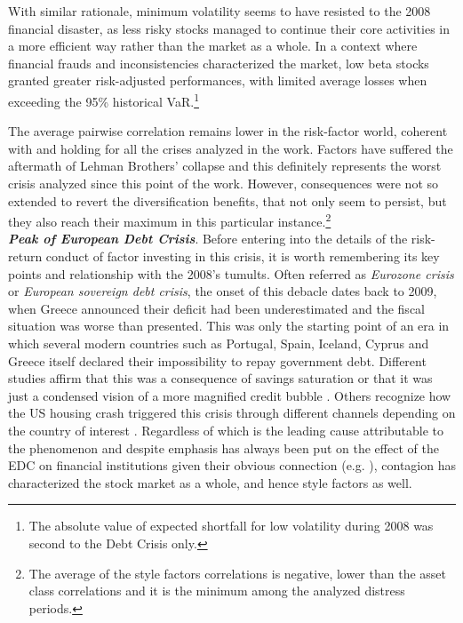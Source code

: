 \documentclass[12pt]{article}
\begin{document}
With similar rationale, minimum volatility seems to have resisted to the 2008 financial disaster, as less risky stocks managed to continue their core activities in a more efficient way rather than the market as a whole. In a context where financial frauds and inconsistencies characterized the market, low beta stocks granted greater risk-adjusted performances, with limited average losses when exceeding the 95\% historical VaR.\footnote{The absolute value of expected shortfall for low volatility during 2008 was second to the Debt Crisis only.}

The average pairwise correlation remains lower in the risk-factor world, coherent with  and holding for all the crises analyzed in the work. Factors have suffered the aftermath of Lehman Brothers' collapse and this definitely represents the worst crisis analyzed since this point of the work. However, consequences were not so extended to revert the diversification benefits, that not only seem to persist, but they also reach their maximum in this particular instance.\footnote{The average of the style factors correlations is negative, lower than the asset class correlations and it is the minimum among the analyzed distress periods.} \\


\textit{\textbf{Peak of European Debt Crisis}}. Before entering into the details of the risk-return conduct of factor investing in this crisis, it is worth remembering its key points and relationship with the 2008's tumults. Often referred as \textit{Eurozone crisis} or \textit{European sovereign debt crisis}, the onset of this debacle dates back to 2009, when Greece announced their deficit had been underestimated and the fiscal situation was worse than presented. This was only the starting point of an era in which several modern countries such as Portugal, Spain, Iceland, Cyprus and Greece itself declared their impossibility to repay government debt. Different studies affirm that this was a consequence of savings saturation or that it was just a condensed vision of a more magnified credit bubble \cite{lund2010debt}. Others recognize how the US housing crash triggered this crisis through different channels depending on the country of interest \cite{beker2014european}. Regardless of which is the leading cause attributable to the phenomenon and despite emphasis has always been put on the effect of the EDC on financial institutions given their obvious connection (e.g. ), contagion has characterized the stock market as a whole, and hence style factors as well.
\end{document}
